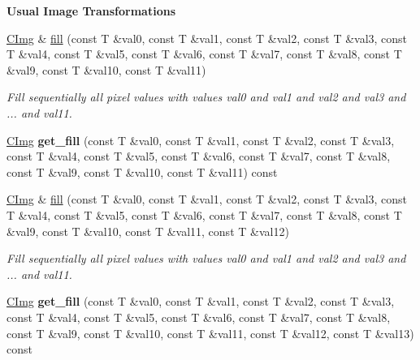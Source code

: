 \begin{Indent}{\bf Usual Image Transformations}
\begin{DoxyCompactItemize}
\item 
\hyperlink{structcimg__library_1_1_c_img}{CImg} \& \hyperlink{structcimg__library_1_1_c_img_a25bb9c696dc72ea9fbdbf8c0ea9494b9}{fill} (const T \&val0, const T \&val1, const T \&val2, const T \&val3, const T \&val4, const T \&val5, const T \&val6, const T \&val7, const T \&val8, const T \&val9, const T \&val10, const T \&val11)
\begin{DoxyCompactList}\small\item\em Fill sequentially all pixel values with values {\itshape val0\/} and {\itshape val1\/} and {\itshape val2\/} and {\itshape val3\/} and {\itshape \/}... and {\itshape val11\/}. \item\end{DoxyCompactList}\item 
\hypertarget{structcimg__library_1_1_c_img_a67d30666f03f457e70ba484f0b54bd3c}{
\hyperlink{structcimg__library_1_1_c_img}{CImg} {\bfseries get\_\-fill} (const T \&val0, const T \&val1, const T \&val2, const T \&val3, const T \&val4, const T \&val5, const T \&val6, const T \&val7, const T \&val8, const T \&val9, const T \&val10, const T \&val11) const }
\label{structcimg__library_1_1_c_img_a67d30666f03f457e70ba484f0b54bd3c}

\item 
\hyperlink{structcimg__library_1_1_c_img}{CImg} \& \hyperlink{structcimg__library_1_1_c_img_a1ecd792063de38175282ecb791eb3cc9}{fill} (const T \&val0, const T \&val1, const T \&val2, const T \&val3, const T \&val4, const T \&val5, const T \&val6, const T \&val7, const T \&val8, const T \&val9, const T \&val10, const T \&val11, const T \&val12)
\begin{DoxyCompactList}\small\item\em Fill sequentially all pixel values with values {\itshape val0\/} and {\itshape val1\/} and {\itshape val2\/} and {\itshape val3\/} and {\itshape \/}... and {\itshape val11\/}. \item\end{DoxyCompactList}\item 
\hypertarget{structcimg__library_1_1_c_img_a5b75fc7baa6d8807abb6f8cb09d4f747}{
\hyperlink{structcimg__library_1_1_c_img}{CImg} {\bfseries get\_\-fill} (const T \&val0, const T \&val1, const T \&val2, const T \&val3, const T \&val4, const T \&val5, const T \&val6, const T \&val7, const T \&val8, const T \&val9, const T \&val10, const T \&val11, const T \&val12, const T \&val13) const }
\label{structcimg__library_1_1_c_img_a5b75fc7baa6d8807abb6f8cb09d4f747}


\end{DoxyCompactItemize}
\end{Indent}
